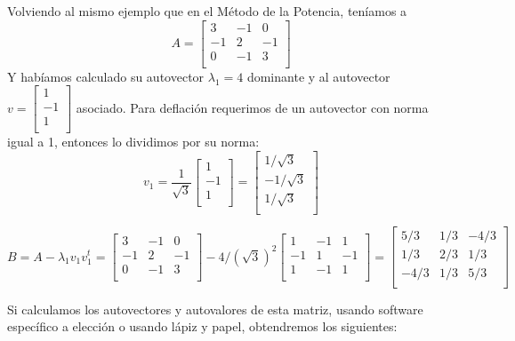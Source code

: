 Volviendo al mismo ejemplo que en el Método de la Potencia, teníamos a
\[
  A =
  \left[ {\begin{array}{ccc}
   3 & -1 & 0 \\
   -1 & 2 & -1 \\
   0 & -1 & 3 \\
  \end{array} } \right]
\]
Y habíamos calculado su autovector $\lambda_1 = 4$ dominante y al autovector 
$ v =
    \left[ {\begin{array}{ccc}
   1 \\
   -1 \\
   1 \\
  \end{array} } \right]$ asociado. Para deflación requerimos de un autovector con norma igual a 1,
 entonces lo dividimos por su norma: 
\[ v_1 = \frac{1}{\sqrt{3}}
    \left[ {\begin{array}{ccc}
   1 \\
   -1 \\
   1 \\
  \end{array} } \right] = 
  \left[ {\begin{array}{ccc}
   1/\sqrt{3} \\
   -1/\sqrt{3} \\
   1/\sqrt{3} \\
  \end{array} } \right] \]

\[   B = A - \lambda_1 v_1 v_1^t =
  \left[ {\begin{array}{ccc}
   3 & -1 & 0 \\
   -1 & 2 & -1 \\
   0 & -1 & 3 \\ 
   \end{array} } \right] - 4/(\sqrt{3})^2 
  \left[ {\begin{array}{ccc}
   1 & -1 & 1 \\
   -1 & 1 & -1 \\
   1 & -1 & 1 \\
  \end{array} } \right] = 
  \left[ {\begin{array}{ccc}
   5/3 & 1/3 & -4/3 \\
   1/3 & 2/3 & 1/3 \\
   -4/3 & 1/3 & 5/3 \\
  \end{array} } \right] \] 

Si calculamos los autovectores y autovalores de esta matriz, usando software específico a elección o 
usando lápiz y papel, obtendremos los siguientes:

